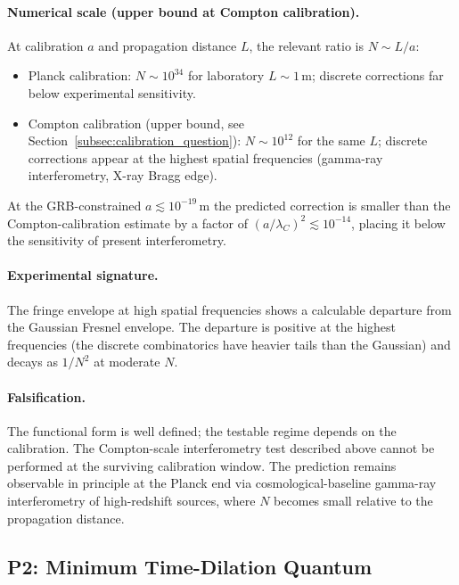 \paragraph{Numerical scale (upper bound at Compton calibration).}
At calibration $a$ and propagation distance $L$, the relevant
ratio is $N \sim L/a$:

\begin{itemize}
    \item Planck calibration: $N \sim 10^{34}$ for laboratory $L \sim 1\,\text{m}$;
    discrete corrections far below experimental sensitivity.
    \item Compton calibration (upper bound, see
    Section~\ref{subsec:calibration_question}): $N \sim 10^{12}$ for
    the same $L$; discrete corrections appear at the highest spatial
    frequencies (gamma-ray interferometry, X-ray Bragg edge).
\end{itemize}
At the GRB-constrained $a \lesssim 10^{-19}\,\text{m}$ the predicted
correction is smaller than the Compton-calibration estimate by a
factor of $(a/\lambda_C)^2 \lesssim 10^{-14}$, placing it below the
sensitivity of present interferometry.

\paragraph{Experimental signature.}
The fringe envelope at high spatial frequencies shows a calculable
departure from the Gaussian Fresnel envelope. The departure is
positive at the highest frequencies (the discrete combinatorics
have heavier tails than the Gaussian) and decays as $1/N^2$ at
moderate $N$.

\paragraph{Falsification.}
The functional form is well defined; the testable regime depends on
the calibration. The Compton-scale interferometry test described
above cannot be performed at the surviving calibration window. The
prediction remains observable in principle at the Planck end via
cosmological-baseline gamma-ray interferometry of high-redshift
sources, where $N$ becomes small relative to the propagation
distance.

\subsection{P2: Minimum Time-Dilation Quantum}
\label{subsec:p2_dilation_quantum}

